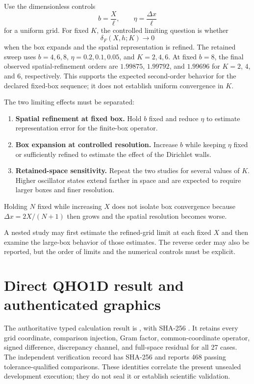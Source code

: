 Use the dimensionless controls
\begin{equation}
    b=\frac{X}{\ell},
    \qquad
    \eta=\frac{\Delta x}{\ell}
\end{equation}
for a uniform grid. For fixed $K$, the controlled limiting question is whether
\begin{equation}
    \delta_F(X,h;K)
    \longrightarrow
    0
\end{equation}
when the box expands and the spatial representation is refined. The retained
sweep uses $b=4,6,8$, $\eta=0.2,0.1,0.05$, and $K=2,4,6$. At fixed $b=8$, the
final observed spatial-refinement orders are $1.99875$, $1.99792$, and
$1.99696$ for $K=2$, $4$, and $6$, respectively. This supports the expected
second-order behavior for the declared fixed-box sequence; it does not
establish uniform convergence in $K$.

The two limiting effects must be separated:
\begin{enumerate}
    \item \textbf{Spatial refinement at fixed box.} Hold $b$ fixed and reduce
          $\eta$ to estimate representation error for the finite-box operator.
    \item \textbf{Box expansion at controlled resolution.} Increase $b$ while
          keeping $\eta$ fixed or sufficiently refined to estimate the effect
          of the Dirichlet walls.
    \item \textbf{Retained-space sensitivity.} Repeat the two studies for
          several values of $K$. Higher oscillator states extend farther in
          space and are expected to require larger boxes and finer resolution.
\end{enumerate}
Holding $N$ fixed while increasing $X$ does not isolate box convergence because
$\Delta x=2X/(N+1)$ then grows and the spatial resolution becomes worse.

A nested study may first estimate the refined-grid limit at each fixed $X$ and
then examine the large-box behavior of those estimates. The reverse order may
also be reported, but the order of limits and the numerical controls must be
explicit.

\section{Direct QHO1D result and authenticated graphics}

The authoritative typed calculation result is
,
with SHA-256
.
It retains every grid coordinate, comparison injection, Gram factor,
common-coordinate operator, signed difference, discrepancy channel, and full-space
residual for all 27 cases. The independent verification record has SHA-256
and reports 468 passing tolerance-qualified comparisons. These identities correlate
the present unsealed development execution; they do not seal it or establish
scientific validation.

